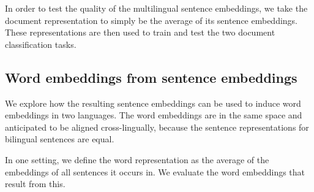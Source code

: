In order to test the quality of the multilingual sentence embeddings, we take the document representation to simply be the average of its sentence embeddings. These representations are then used to train and test the two document classification tasks.


\subsection{Word embeddings from sentence embeddings}
We explore how the resulting sentence embeddings can be used to induce word embeddings in two languages. The word embeddings are in the same space and anticipated to be aligned cross-lingually, because the sentence representations for bilingual sentences are equal.

In one setting, we define the word representation as the average of the embeddings of all sentences it occurs in. We evaluate the word embeddings that result from this.



